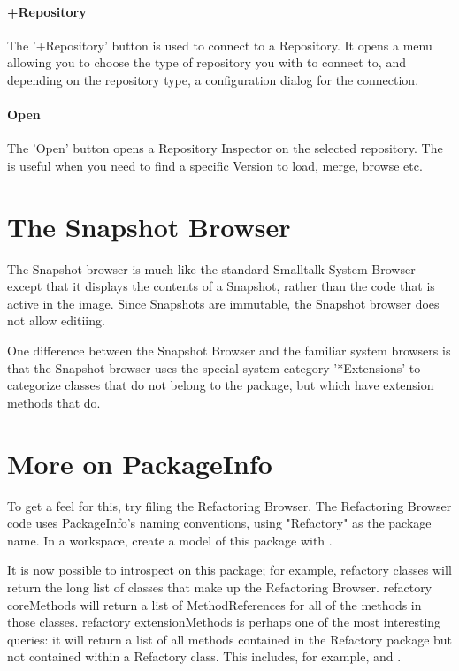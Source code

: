 \documentclass[a4paper,10pt,twoside]{book}
\begin{document}
\paragraph{+Repository}

The '+Repository' button is used to connect to a Repository. It opens a menu allowing you to choose the type of repository you with to connect to, and depending on the repository type, a configuration dialog for the connection.

\paragraph{Open}

The 'Open' button opens a Repository Inspector on the selected repository. The is useful when you need to find a specific Version to load, merge, browse etc.

\section{The Snapshot Browser}

The Snapshot browser is much like the standard Smalltalk System Browser except that it displays the contents of a Snapshot, rather than the code that is active in the image. Since Snapshots are immutable, the Snapshot browser does not allow editiing.

One difference between the Snapshot Browser and the familiar system browsers is that the Snapshot browser uses the special system category '*Extensions' to categorize classes that do not belong to the package, but which have extension methods that do.

\section{More on PackageInfo}
To get a feel for this, try filing the Refactoring Browser. The Refactoring Browser code uses PackageInfo's naming conventions, using "Refactory" as the package name. In a workspace, create a model of this package with  . 

It is now possible to introspect on this package; for example, refactory classes will return the long list of classes that make up the Refactoring Browser. refactory coreMethods will return a list of MethodReferences for all of the methods in those classes. refactory extensionMethods is perhaps one of the most interesting queries: it will return a list of all methods contained in the Refactory package but not contained within a Refactory class. This includes, for example,  and .
\end{document}
